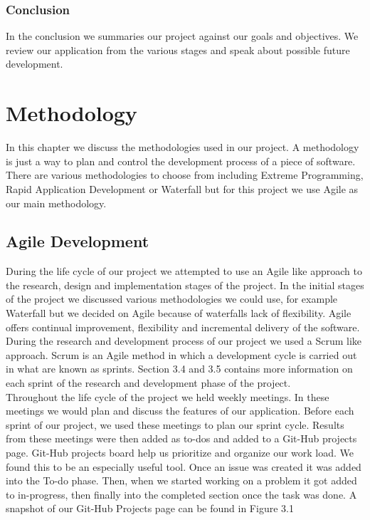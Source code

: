 \documentclass[12pt,a4paper,oneside,openany]{book}
\begin{document}
\subsection{Conclusion}
In the conclusion we summaries our project against our goals and objectives. We review our application from the various stages and speak about possible future development.

\chapter{Methodology}

In this chapter we discuss the methodologies used in our project. A methodology is just a way to plan and control the development process of a piece of software. There are various methodologies to choose from including Extreme Programming, Rapid Application Development or Waterfall but for this project we use Agile as our main methodology.

\section{Agile Development}
During the life cycle of our project we attempted to use an Agile like approach to the research, design and implementation stages of the project. In the initial stages of the project we discussed various methodologies we could use, for example Waterfall but we decided on Agile because of waterfalls lack of flexibility. Agile offers continual improvement, flexibility and incremental delivery of the software.  \\

\noindent During the research and development process of our project we used a Scrum like approach. Scrum is an Agile method in which a development cycle is carried out in what are known as sprints. Section 3.4 and 3.5 contains more information on each sprint of the research and development phase of the project. \\

\noindent Throughout the life cycle of the project we held weekly meetings. In these meetings we would plan and discuss the features of our application. Before each sprint of our project, we used these meetings to plan our sprint cycle. Results from these meetings were then added as to-dos and added to a Git-Hub projects page. Git-Hub projects board help us prioritize and organize our work load. We found this to be an especially useful tool. Once an issue was created it was added into the To-do phase. Then, when we started working on a problem it got added to in-progress, then finally into the completed section once the task was done. A snapshot of our Git-Hub Projects page can be found in Figure 3.1
\end{document}
